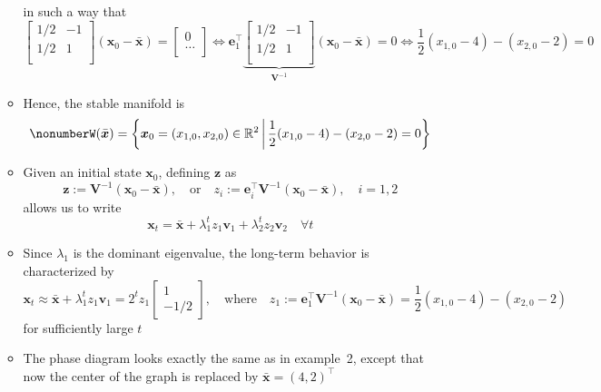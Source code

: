 \documentclass[12pt,a4paper]{article}
\begin{document}
\begin{itemize}
\begin{itemize}
      in such a way that
      \begin{equation}\nonumber%
      \begin{bmatrix}
        1/2 & -1 \\
        1/2 & 1 \\
      \end{bmatrix}
      (\bm{x}_{0}-\bar{\bm{x}})
      = 
      \begin{bmatrix}
        0 \\
        \ldots \\
      \end{bmatrix}
      \iff
      \bm{e}_{1}^{\top}
      \underbrace{\begin{bmatrix}
        1/2 & -1 \\
        1/2 & 1 \\
      \end{bmatrix}}_{\bm{V}^{-1}}
      (\bm{x}_{0}-\bar{\bm{x}})
      = 0
      \iff
      \frac{1}{2}(x_{1,0}-4) - (x_{2,0}-2) = 0
      \end{equation}
    \item Hence, the stable manifold is
      \begin{equation}\nonumber%
        W(\bar{\bm{x}}) = \left\{\bm{x}_{0}=(x_{1,0},x_{2,0})\in \R^{2}\,\bigg|\, \frac{1}{2}(x_{1,0}-4) - (x_{2,0}-2) = 0 \right\}
      \end{equation}
    \item Given an initial state $\bm{x}_{0}$,
      defining $\bm{z}$ as
      \begin{equation}\nonumber%
        \bm{z} := \bm{V}^{-1}(\bm{x}_{0}-\bar{\bm{x}}),
        \quad\text{or}\quad
        z_{i} := \bm{e}_{i}^{\top}\bm{V}^{-1}(\bm{x}_{0}-\bar{\bm{x}}),
        \quad i = 1, 2
      \end{equation}
      allows us to write
    \begin{equation}\nonumber%
      \bm{x}_{t}
      =
      \bar{\bm{x}} + 
      \lambda_{1}^{t}z_{1}\bm{v}_{1}
      +
      \lambda_{2}^{t}z_{2}\bm{v}_{2}
      \quad \forall t
    \end{equation}
    \item Since $\lambda_{1}$ is the dominant eigenvalue,
      the long-term behavior is characterized by
    \begin{equation}\nonumber%
      \bm{x}_{t}
      \approx
      \bar{\bm{x}} +
      \lambda_{1}^{t}z_{1}\bm{v}_{1}
      =
      2^{t}z_{1}
      \begin{bmatrix}
        1 \\ -1/2
      \end{bmatrix},
      \quad\text{where}\quad
      z_{1}:=\bm{e}_{1}^{\top}\bm{V}^{-1}(\bm{x}_{0}-\bar{\bm{x}})
      = \frac{1}{2}(x_{1,0}-4) - (x_{2,0}-2)
    \end{equation}
    for sufficiently large $t$
  \item The phase diagram looks exactly the same as in example~2,
    except that now the center of the graph is replaced by $\bar{\bm{x}}=(4,2)^{\top}$
  \end{itemize}


\end{itemize}
\end{document}

